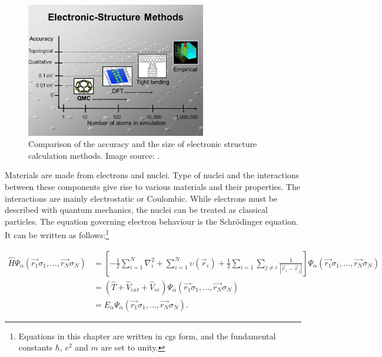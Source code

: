 \begin{figure}[htbp!] 
\centering  
\includegraphics[width=0.7\textwidth]{dft1.jpg}
\caption{ Comparison of the accuracy and the size of electronic structure calculation methods. Image source: \cite{dft_ac}.}  
\label{fig:dft_ac}
\end{figure} 

Materials are made from electrons and nuclei. Type of nuclei and the interactions between these components give rise to various materials and their properties. The interactions are mainly electrostatic or Coulombic. While electrons must be described with quantum mechanics, the nuclei can be treated as classical particles. The equation governing electron behaviour is the Schr\"{o}dinger equation. It can be written as follows:\footnote{Equations in this chapter are written in cgs form, and the fundamental constants $\hbar$, $e^2$ and $m$ are set to unity.}

\begin{equation}
\begin{aligned}
\hat{H}\mathit{\Psi}_\alpha(\vec{r_1}\sigma_1,\ldots,\vec{r_N}\sigma_N) &=\left[ -\frac{1}{2}\sum^N_{i=1}\nabla_i^2+\sum^N_{i=1}\upsilon(\vec{r}_i)+\frac{1}{2}\sum_{i=1}\sum_{j\neq i}\frac{1}{|\vec{r}_i-\vec{r}_j|}\right]\mathit{\Psi}_\alpha(\vec{r_1}\sigma_1,\ldots,\vec{r_N}\sigma_N)  \\
&=\left( \hat{T} + \hat{V}_{ext} + \hat{V}_{ee}\right)\mathit{\Psi}_\alpha(\vec{r_1}\sigma_1,\ldots,\vec{r_N}\sigma_N) \\
&=E_\alpha\mathit{\Psi}_\alpha(\vec{r_1}\sigma_1,\ldots,\vec{r_N}\sigma_N) .
\end{aligned}
\end{equation}

